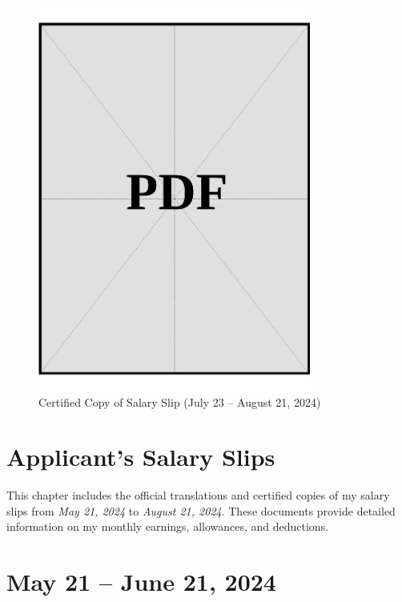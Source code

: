 \begin{figure}[h]
    \centering
    \includegraphics[page=1, width=0.8\textwidth]{../application-docs/sponsor/funds/salary-slips/month-3/certified-copies.pdf}
    \caption{Certified Copy of Salary Slip (July 23 – August 21, 2024)}
    \label{fig:month-3-certified}
\end{figure}

\vspace*{\fill}
\clearpage



\section{Applicant's Salary Slips}\label{sec:applicant-salary-slips}
\noindent
This chapter includes the official translations and certified copies of my salary slips from \textit{May 21, 2024} to \textit{August 21, 2024}. These documents provide detailed information on my monthly earnings, allowances, and deductions.

\clearpage

\section*{May 21 – June 21, 2024}

